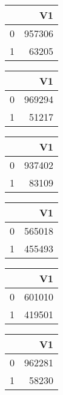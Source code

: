 \bigskip\bigskip
\centering
\begin{tabular}{rr}
  \hline
 & V1 \\ 
  \hline
0 & 957306 \\ 
  1 & 63205 \\ 
   \hline
\end{tabular}

\bigskip\bigskip
\centering
\begin{tabular}{rr}
  \hline
 & V1 \\ 
  \hline
0 & 969294 \\ 
  1 & 51217 \\ 
   \hline
\end{tabular}

\bigskip\bigskip
\centering
\begin{tabular}{rr}
  \hline
 & V1 \\ 
  \hline
0 & 937402 \\ 
  1 & 83109 \\ 
   \hline
\end{tabular}

\bigskip\bigskip
\centering
\begin{tabular}{rr}
  \hline
 & V1 \\ 
  \hline
0 & 565018 \\ 
  1 & 455493 \\ 
   \hline
\end{tabular}

\bigskip\bigskip
\centering
\begin{tabular}{rr}
  \hline
 & V1 \\ 
  \hline
0 & 601010 \\ 
  1 & 419501 \\ 
   \hline
\end{tabular}

\bigskip\bigskip
\centering
\begin{tabular}{rr}
  \hline
 & V1 \\ 
  \hline
0 & 962281 \\ 
  1 & 58230 \\ 
   \hline
\end{tabular}

